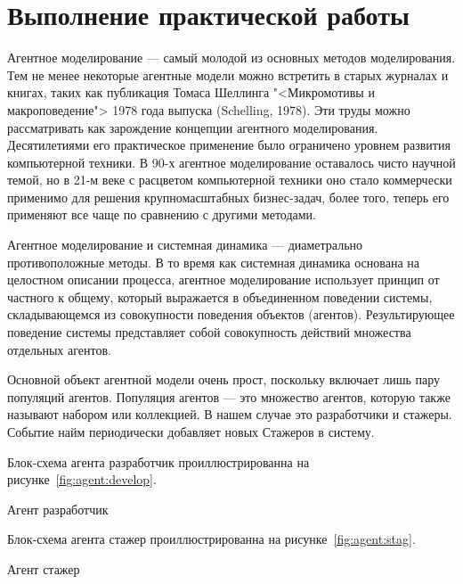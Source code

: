 \graphicspath{{./eleventh/img}} %

\section*{Выполнение практической работы}
Агентное моделирование --- самый молодой из основных методов
моделирования. Тем не менее некоторые агентные модели можно
встретить в старых журналах и книгах, таких как публикация Томаса
Шеллинга "<Микромотивы и макроповедение"> 1978 года выпуска (Schelling,
1978). Эти труды можно рассматривать как зарождение концепции
агентного моделирования. Десятилетиями его практическое применение
было ограничено уровнем развития компьютерной техники. В 90-х агентное
моделирование оставалось чисто научной темой, но в 21-м веке с расцветом
компьютерной техники оно стало коммерчески применимо для решения
крупномасштабных бизнес-задач, более того, теперь его применяют все
чаще по сравнению с другими методами.\par
Агентное моделирование и системная динамика --- диаметрально
противоположные методы. В то время как системная динамика основана
на целостном описании процесса, агентное моделирование использует
принцип от частного к общему, который выражается в объединенном
поведении системы, складывающемся из совокупности поведения объектов
(агентов). Результирующее поведение системы представляет собой
совокупность действий множества отдельных агентов.\par
Основной объект агентной модели очень прост, поскольку включает лишь
пару популяций агентов. Популяция агентов --- это множество агентов,
которую также называют набором или коллекцией. В нашем случае
это разработчики и стажеры. Событие найм периодически добавляет
новых Стажеров в систему.\par
Блок-схема агента разработчик проиллюстрированна
на рисунке~\ref{fig:agent:develop}.

\begin{image}
	\caption{Агент разработчик}
	\label{fig:agent:develop}
\end{image}

Блок-схема агента стажер проиллюстрированна
на рисунке~\ref{fig:agent:stag}.

\begin{image}
	\caption{Агент стажер}
	\label{fig:agent:stag}
\end{image}

